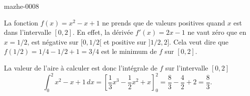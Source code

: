 
\begin{corrige}{mazhe-0008}

La fonction $f(x) = x^2 - x +1$ ne prends que de valeurs positives quand $x$ est dans l'intervalle $[0,2]$. En effet, la dérivée $f'(x) = 2x -1 $ ne vaut zéro que en $x = 1/2$, est négative sur $[0,1/2[$ et positive sur $]1/2, 2]$. Cela veut dire que $ f(1/2) = 1/4  -1/2 + 1  = 3/4$ est le minimum de $f$ sur $[0,2]$.

La valeur de l'aire à calculer est donc l'intégrale de $f$ sur l'intervalle $[0,2]$
\begin{equation*}
  \int_0^2 x^2 - x +1 \, dx = \left[\frac{1}{3} x ^3 -\frac{1}{2} x^2 + x\right]_0^2 = \frac{8}{3} -\frac{4}{2} + 2 = \frac{8}{3}.
\end{equation*}

\end{corrige}
	
